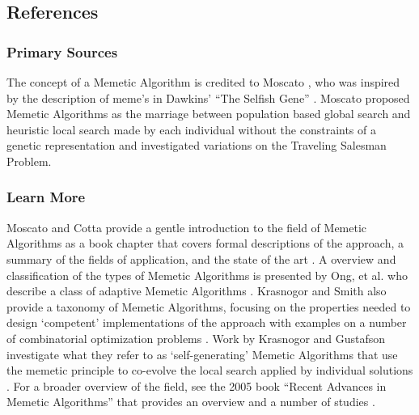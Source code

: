 

\subsection{References}

% 
% 
\subsubsection{Primary Sources}
The concept of a Memetic Algorithm is credited to Moscato \cite{Moscato1989}, who was inspired by the description of meme's in Dawkins' ``The Selfish Gene'' \cite{Dawkins1976}. Moscato proposed Memetic Algorithms as the marriage between population based global search and heuristic local search made by each individual without the constraints of a genetic representation and investigated variations on the Traveling Salesman Problem.

% 
% 
\subsubsection{Learn More}
Moscato and Cotta provide a gentle introduction to the field of Memetic Algorithms as a book chapter that covers formal descriptions of the approach, a summary of the fields of application, and the state of the art \cite{Moscato2003}.
A overview and classification of the types of Memetic Algorithms is presented by Ong, et al. who describe a class of adaptive Memetic Algorithms \cite{Ong2006}. Krasnogor and Smith also provide a taxonomy of Memetic Algorithms, focusing on the properties needed to design `competent' implementations of the approach with examples on a number of combinatorial optimization problems \cite{Krasnogor2005}. Work by Krasnogor and Gustafson investigate what they refer to as `self-generating' Memetic Algorithms that use the memetic principle to co-evolve the local search applied by individual solutions \cite{Krasnogor2004}. 
For a broader overview of the field, see the 2005 book ``Recent Advances in Memetic Algorithms'' that provides an overview and a number of studies \cite{Hart2005}.


